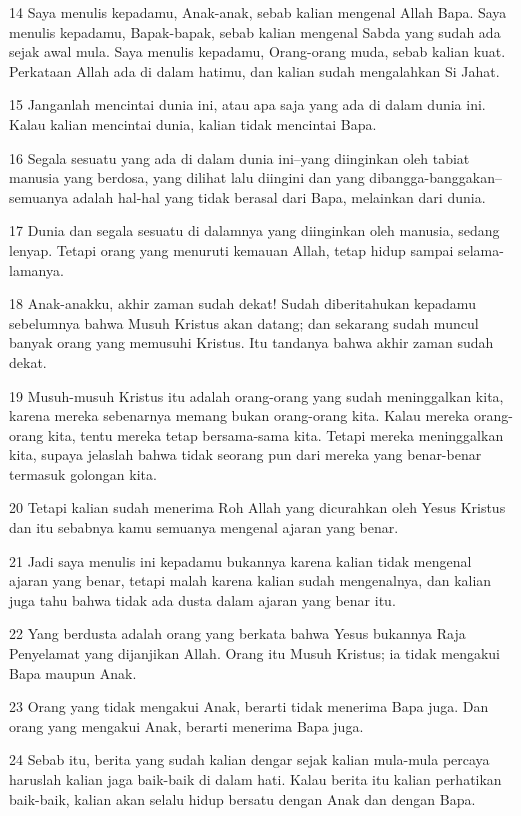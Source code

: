 \par 14 Saya menulis kepadamu, Anak-anak, sebab kalian mengenal Allah Bapa. Saya menulis kepadamu, Bapak-bapak, sebab kalian mengenal Sabda yang sudah ada sejak awal mula. Saya menulis kepadamu, Orang-orang muda, sebab kalian kuat. Perkataan Allah ada di dalam hatimu, dan kalian sudah mengalahkan Si Jahat.
\par 15 Janganlah mencintai dunia ini, atau apa saja yang ada di dalam dunia ini. Kalau kalian mencintai dunia, kalian tidak mencintai Bapa.
\par 16 Segala sesuatu yang ada di dalam dunia ini--yang diinginkan oleh tabiat manusia yang berdosa, yang dilihat lalu diingini dan yang dibangga-banggakan--semuanya adalah hal-hal yang tidak berasal dari Bapa, melainkan dari dunia.
\par 17 Dunia dan segala sesuatu di dalamnya yang diinginkan oleh manusia, sedang lenyap. Tetapi orang yang menuruti kemauan Allah, tetap hidup sampai selama-lamanya.
\par 18 Anak-anakku, akhir zaman sudah dekat! Sudah diberitahukan kepadamu sebelumnya bahwa Musuh Kristus akan datang; dan sekarang sudah muncul banyak orang yang memusuhi Kristus. Itu tandanya bahwa akhir zaman sudah dekat.
\par 19 Musuh-musuh Kristus itu adalah orang-orang yang sudah meninggalkan kita, karena mereka sebenarnya memang bukan orang-orang kita. Kalau mereka orang-orang kita, tentu mereka tetap bersama-sama kita. Tetapi mereka meninggalkan kita, supaya jelaslah bahwa tidak seorang pun dari mereka yang benar-benar termasuk golongan kita.
\par 20 Tetapi kalian sudah menerima Roh Allah yang dicurahkan oleh Yesus Kristus dan itu sebabnya kamu semuanya mengenal ajaran yang benar.
\par 21 Jadi saya menulis ini kepadamu bukannya karena kalian tidak mengenal ajaran yang benar, tetapi malah karena kalian sudah mengenalnya, dan kalian juga tahu bahwa tidak ada dusta dalam ajaran yang benar itu.
\par 22 Yang berdusta adalah orang yang berkata bahwa Yesus bukannya Raja Penyelamat yang dijanjikan Allah. Orang itu Musuh Kristus; ia tidak mengakui Bapa maupun Anak.
\par 23 Orang yang tidak mengakui Anak, berarti tidak menerima Bapa juga. Dan orang yang mengakui Anak, berarti menerima Bapa juga.
\par 24 Sebab itu, berita yang sudah kalian dengar sejak kalian mula-mula percaya haruslah kalian jaga baik-baik di dalam hati. Kalau berita itu kalian perhatikan baik-baik, kalian akan selalu hidup bersatu dengan Anak dan dengan Bapa.
